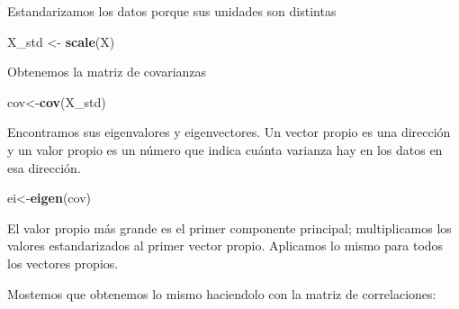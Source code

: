 \documentclass[]{article}
\newenvironment{Shaded}{\begin{snugshade}}{\end{snugshade}}
\newcommand{\ControlFlowTok}[1]{\textcolor[rgb]{0.13,0.29,0.53}{\textbf{#1}}}
\newcommand{\DataTypeTok}[1]{\textcolor[rgb]{0.13,0.29,0.53}{#1}}
\newcommand{\DecValTok}[1]{\textcolor[rgb]{0.00,0.00,0.81}{#1}}
\newcommand{\KeywordTok}[1]{\textcolor[rgb]{0.13,0.29,0.53}{\textbf{#1}}}
\newcommand{\NormalTok}[1]{#1}
\newcommand{\OperatorTok}[1]{\textcolor[rgb]{0.81,0.36,0.00}{\textbf{#1}}}
\newcommand{\OtherTok}[1]{\textcolor[rgb]{0.56,0.35,0.01}{#1}}
\newcommand{\StringTok}[1]{\textcolor[rgb]{0.31,0.60,0.02}{#1}}
\begin{document}
Estandarizamos los datos porque sus unidades son distintas

\begin{Shaded}
\begin{Highlighting}[]
\NormalTok{X_std <-}\StringTok{ }\KeywordTok{scale}\NormalTok{(X)}
\end{Highlighting}
\end{Shaded}

Obtenemos la matriz de covarianzas

\begin{Shaded}
\begin{Highlighting}[]
\NormalTok{cov<-}\KeywordTok{cov}\NormalTok{(X_std)}
\end{Highlighting}
\end{Shaded}

Encontramos sus eigenvalores y eigenvectores. Un vector propio es una
dirección y un valor propio es un número que indica cuánta varianza hay
en los datos en esa dirección.

\begin{Shaded}
\begin{Highlighting}[]
\NormalTok{ei<-}\KeywordTok{eigen}\NormalTok{(cov)}
\end{Highlighting}
\end{Shaded}

El valor propio más grande es el primer componente principal;
multiplicamos los valores estandarizados al primer vector propio.
Aplicamos lo mismo para todos los vectores propios.

\begin{Shaded}
\end{Shaded}

Mostemos que obtenemos lo mismo haciendolo con la matriz de
correlaciones:

\begin{Shaded}
\end{Shaded}
\end{document}
